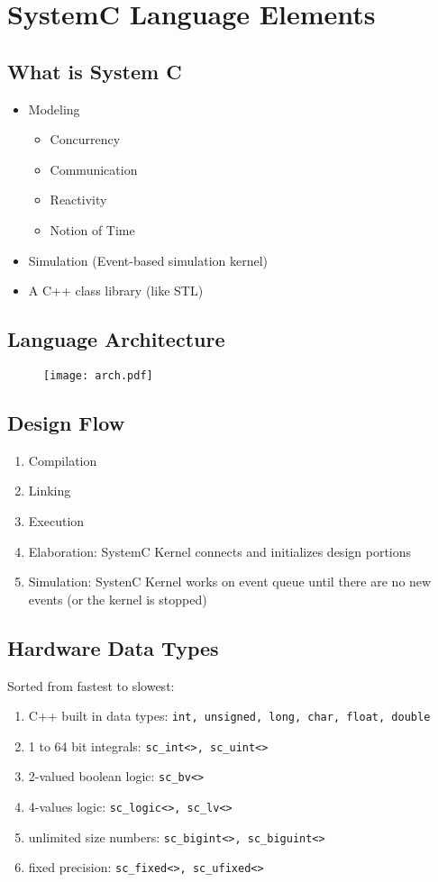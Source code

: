 \chapter{SystemC Language Elements}
\section{What is System C}
\begin{itemize}
    \item Modeling
        \begin{itemize}
            \item Concurrency
            \item Communication
            \item Reactivity
            \item Notion of Time
        \end{itemize}
    \item Simulation (Event-based simulation kernel)
    \item A C++ class library (like STL)
\end{itemize}

\section{Language Architecture}
\begin{figure}[H]
    \centering
    \texttt{[image: arch.pdf]}
\end{figure}

\section{Design Flow}
\begin{enumerate}
    \item Compilation
    \item Linking
    \item Execution
    \item Elaboration: SystemC Kernel connects and initializes design portions
    \item Simulation: SystenC Kernel works on event queue until there are no new events (or the kernel is stopped)
\end{enumerate}

\section{Hardware Data Types}
Sorted from fastest to slowest:
\begin{enumerate}
    \item C++ built in data types: \lstinline{int, unsigned, long, char, float, double}
    \item 1 to 64 bit integrals: \lstinline{sc_int<>, sc_uint<>}
    \item 2-valued boolean logic: \lstinline{sc_bv<>}
    \item 4-values logic: \lstinline{sc_logic<>, sc_lv<>}
    \item unlimited size numbers: \lstinline{sc_bigint<>, sc_biguint<>}
    \item fixed precision: \lstinline{sc_fixed<>, sc_ufixed<>}
\end{enumerate}

